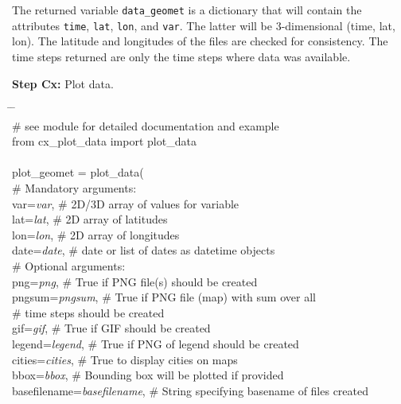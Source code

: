 \documentclass[10pt,a4paper,titlepage,parskip]{scrartcl}
\newenvironment{ttfont}{\fontfamily{\ttdefault}\selectfont}{\par}
\newcommand{\GRAU}[1]{\textcolor{ufzgray2}{#1}}
\begin{document}
\vspace*{-0.3cm}
The returned variable \texttt{data\_geomet} is a dictionary that will contain the attributes \texttt{time}, \texttt{lat}, \texttt{lon}, and \texttt{var}. The latter will be 3-dimensional (time, lat, lon). The latitude and longitudes of the files are checked for consistency. The time steps returned are only the time steps where data was available.

\textbf{Step Cx:} Plot data.
\begin{framed}
	\vspace*{-1.2cm}
	\begin{ttfont}
		\begin{tabbing}
			\hspace{1.0cm} \= \hspace{5.2cm} \= \kill \\[4pt]
			\GRAU{\# see module for detailed documentation and example}\\
			from cx\_plot\_data import plot\_data\\
			\\
			plot\_geomet = plot\_data(\\
			\> \GRAU{\# Mandatory arguments:}\\
			\> var=\textit{var}, \> \GRAU{\# 2D/3D array of values for variable}\\
			\> lat=\textit{lat}, \> \GRAU{\# 2D array of latitudes}\\
			\> lon=\textit{lon}, \> \GRAU{\# 2D array of longitudes}\\
			\> date=\textit{date}, \> \GRAU{\# date or list of dates as datetime objects}\\
			\> \GRAU{\# Optional arguments:}\\
			\> png=\textit{png}, \> \GRAU{\# True if PNG file(s) should be created}\\
			\> pngsum=\textit{pngsum}, \> \GRAU{\# True if PNG file (map) with sum over all }\\
			\> \> \GRAU{\# time steps should be created}\\
			\> gif=\textit{gif}, \> \GRAU{\# True if GIF should be created}\\
			\> legend=\textit{legend}, \> \GRAU{\# True if PNG of legend should be created}\\
			\> cities=\textit{cities}, \> \GRAU{\# True to display cities on maps}\\
			\> bbox=\textit{bbox}, \> \GRAU{\# Bounding box will be plotted if provided}\\
			\> basefilename=\textit{basefilename}, \> \GRAU{\# String specifying basename of files created}\\

\end{tabbing}
\end{ttfont}
\end{framed}
\end{document}
